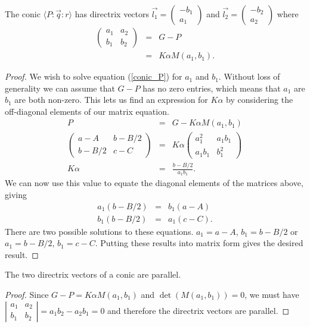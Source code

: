 \begin{theorem}\label{th:dirdir}
The conic $\langle P\!:\!\vec{q}\!:\!r \rangle$ has directrix vectors $\vec{l_1} = \begin{pmatrix}-b_1\\a_1\end{pmatrix}$ and $\vec{l_2} = \begin{pmatrix}-b_2\\a_2\end{pmatrix}$ where
\begin{eqnarray}
\left(\begin{array}{cc}a_1 & a_2\\b_1 & b_2 \end{array} \right) & = & G - P\\
 & = & K\alpha M(a_1, b_1).
\end{eqnarray}
\end{theorem}
\begin{proof}
We wish to solve equation (\ref{conic_P}) for $a_1$ and $b_1$.
Without loss of generality we can assume that $G - P$ has no zero entries, which means that $a_1$ are $b_1$ are both non-zero. This lets us find an expression for $K\alpha$ by considering the off-diagonal elements of our matrix equation.
\begin{eqnarray}
P & = & G - K\alpha M(a_1, b_1)\nonumber\\
\left(\begin{array}{cc} a - A & b - B/2 \\ b - B/2 & c - C \end{array} \right) & = &  K\alpha\left(\begin{array}{cc}a_1^2 & a_1b_1 \\ a_1b_1 & b_1^2 \end{array} \right)\nonumber\\
K\alpha & = & \frac{b - B/2}{a_1b_1}.\label{eq:K}
\end{eqnarray}
We can now use this value to equate the diagonal elements of the matrices above, giving
\begin{eqnarray*}
a_1(b - B/2) & = & b_1(a - A)\\
b_1(b - B/2) & = & a_1(c - C).
\end{eqnarray*}
There are two possible solutions to these equations. $a_1 = a - A$, $b_1 = b - B/2$ or $a_1 = b - B/2$, $b_1 = c - C$.
Putting these results into matrix form gives the desired result.
\end{proof}

\begin{lemma}
The two directrix vectors of a conic are parallel.
\end{lemma}
\begin{proof}
Since $G - P = K\alpha M(a_1, b_1)$ and $\det(M(a_1, b_1)) = 0$, we must have $\left|\begin{array}{cc} a_1 & a_2 \\ b_1 & b_2 \end{array}\right| = a_1b_2 - a_2b_1 = 0$ and therefore the directrix vectors are parallel.
\end{proof}

